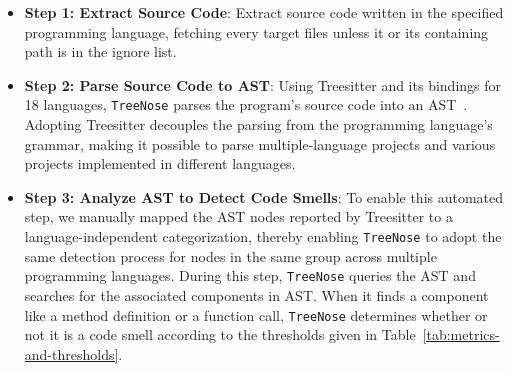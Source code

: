 \begin{itemize}[leftmargin=*]
    \item \textbf{Step 1: Extract Source Code}: Extract source code written in
        the specified programming language, fetching every target files unless
        it or its containing path is in the ignore list.
    \item \textbf{Step 2: Parse Source Code to AST}: Using Treesitter and its
        bindings for 18 languages, \texttt{TreeNose} parses the program's source
        code into an AST~\cite{treeSitter}. Adopting Treesitter decouples the
        parsing from the programming language's grammar, making it possible to
        parse multiple-language projects and various projects implemented in
        different languages.
    \item \textbf{Step 3: Analyze AST to Detect Code Smells}: To enable this
        automated step, we manually mapped the AST nodes reported by Treesitter
        to a language-independent categorization, thereby enabling
        \texttt{TreeNose} to adopt the same detection process for nodes in the
        same group across multiple programming languages. During this step,
        \texttt{TreeNose} queries the AST and searches for the associated
        components in AST. When it finds a component like a method definition or
        a function call, \texttt{TreeNose} determines whether or not it is a
        code smell according to the thresholds given in
        Table~\ref{tab:metrics-and-thresholds}.




\end{itemize}


